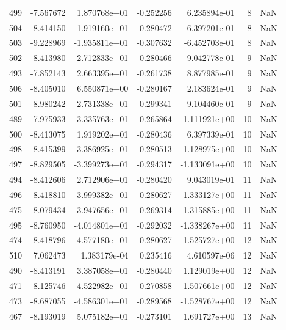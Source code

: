 \begin{tabular}{rrrrrrr}
 499 &  -7.567672 &  1.870768e+01 & -0.252256 &  6.235894e-01 &           8 & NaN \\
 504 &  -8.414150 & -1.919160e+01 & -0.280472 & -6.397201e-01 &           8 & NaN \\
 503 &  -9.228969 & -1.935811e+01 & -0.307632 & -6.452703e-01 &           8 & NaN \\
 502 &  -8.413980 & -2.712833e+01 & -0.280466 & -9.042778e-01 &           9 & NaN \\
 493 &  -7.852143 &  2.663395e+01 & -0.261738 &  8.877985e-01 &           9 & NaN \\
 506 &  -8.405010 &  6.550871e+00 & -0.280167 &  2.183624e-01 &           9 & NaN \\
 501 &  -8.980242 & -2.731338e+01 & -0.299341 & -9.104460e-01 &           9 & NaN \\
 489 &  -7.975933 &  3.335763e+01 & -0.265864 &  1.111921e+00 &          10 & NaN \\
 500 &  -8.413075 &  1.919202e+01 & -0.280436 &  6.397339e-01 &          10 & NaN \\
 498 &  -8.415399 & -3.386925e+01 & -0.280513 & -1.128975e+00 &          10 & NaN \\
 497 &  -8.829505 & -3.399273e+01 & -0.294317 & -1.133091e+00 &          10 & NaN \\
 494 &  -8.412606 &  2.712906e+01 & -0.280420 &  9.043019e-01 &          11 & NaN \\
 496 &  -8.418810 & -3.999382e+01 & -0.280627 & -1.333127e+00 &          11 & NaN \\
 475 &  -8.079434 &  3.947656e+01 & -0.269314 &  1.315885e+00 &          11 & NaN \\
 495 &  -8.760950 & -4.014801e+01 & -0.292032 & -1.338267e+00 &          11 & NaN \\
 474 &  -8.418796 & -4.577180e+01 & -0.280627 & -1.525727e+00 &          12 & NaN \\
 510 &   7.062473 &  1.383179e-04 &  0.235416 &  4.610597e-06 &          12 & NaN \\
 490 &  -8.413191 &  3.387058e+01 & -0.280440 &  1.129019e+00 &          12 & NaN \\
 471 &  -8.125746 &  4.522982e+01 & -0.270858 &  1.507661e+00 &          12 & NaN \\
 473 &  -8.687055 & -4.586301e+01 & -0.289568 & -1.528767e+00 &          12 & NaN \\
 467 &  -8.193019 &  5.075182e+01 & -0.273101 &  1.691727e+00 &          13 & NaN \\

\end{tabular}
